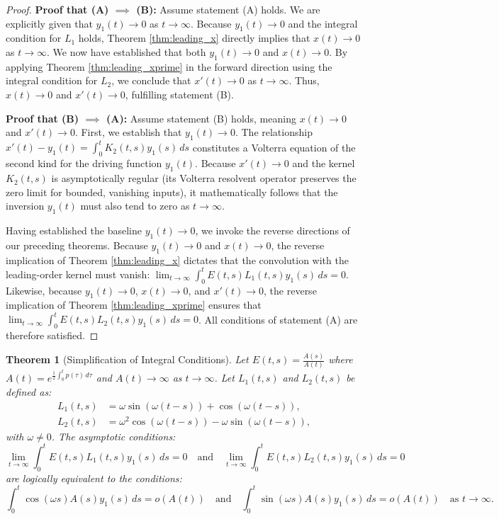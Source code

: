 \documentclass[10pt,reqno]{amsart}
\newtheorem{theorem}{Theorem}
\theoremstyle{definition}
\begin{document}
	\begin{proof}
		\textbf{Proof that (A) $\implies$ (B):}
		Assume statement (A) holds. We are explicitly given that $y_1(t) \to 0$ as $t \to \infty$. 
		Because $y_1(t) \to 0$ and the integral condition for $L_1$ holds, Theorem \ref{thm:leading_x} directly implies that $x(t) \to 0$ as $t \to \infty$.
		We now have established that both $y_1(t) \to 0$ and $x(t) \to 0$. By applying Theorem \ref{thm:leading_xprime} in the forward direction using the integral condition for $L_2$, we conclude that $x'(t) \to 0$ as $t \to \infty$. Thus, $x(t) \to 0$ and $x'(t) \to 0$, fulfilling statement (B).
		
		\textbf{Proof that (B) $\implies$ (A):}
		Assume statement (B) holds, meaning $x(t) \to 0$ and $x'(t) \to 0$.
		First, we establish that $y_1(t) \to 0$. The relationship $x'(t) - y_1(t) = \int_0^t K_2(t, s) y_1(s) \, ds$ constitutes a Volterra equation of the second kind for the driving function $y_1(t)$. Because $x'(t) \to 0$ and the kernel $K_2(t, s)$ is asymptotically regular (its Volterra resolvent operator preserves the zero limit for bounded, vanishing inputs), it mathematically follows that the inversion $y_1(t)$ must also tend to zero as $t \to \infty$. 
		
		Having established the baseline $y_1(t) \to 0$, we invoke the reverse directions of our preceding theorems.
		Because $y_1(t) \to 0$ and $x(t) \to 0$, the reverse implication of Theorem \ref{thm:leading_x} dictates that the convolution with the leading-order kernel must vanish: $\lim_{t \to \infty} \int_0^t E(t, s) L_1(t, s) y_1(s) \, ds = 0$.
		Likewise, because $y_1(t) \to 0$, $x(t) \to 0$, and $x'(t) \to 0$, the reverse implication of Theorem \ref{thm:leading_xprime} ensures that $\lim_{t \to \infty} \int_0^t E(t, s) L_2(t, s) y_1(s) \, ds = 0$. 
		All conditions of statement (A) are therefore satisfied.
	\end{proof}
	
	\begin{theorem}[Simplification of Integral Conditions] \label{thm:integral_simplification}
		Let $E(t, s) = \frac{A(s)}{A(t)}$ where $A(t) = e^{\frac{1}{2} \int_0^t p(\tau) \, d\tau}$ and $A(t) \to \infty$ as $t \to \infty$. Let $L_1(t, s)$ and $L_2(t, s)$ be defined as:
		\begin{align*}
			L_1(t, s) &= \omega \sin(\omega(t-s)) + \cos(\omega(t-s)), \\
			L_2(t, s) &= \omega^2 \cos(\omega(t-s)) - \omega \sin(\omega(t-s)),
		\end{align*}
		with $\omega \neq 0$. The asymptotic conditions:
		\begin{equation} \label{eq:I1_I2_zero}
			\lim_{t \to \infty} \int_0^t E(t, s) L_1(t, s) y_1(s) \, ds = 0 \quad \text{and} \quad \lim_{t \to \infty} \int_0^t E(t, s) L_2(t, s) y_1(s) \, ds = 0
		\end{equation}
		are logically equivalent to the conditions:
		\begin{equation} \label{eq:little_o_conditions}
			\int_0^t \cos(\omega s) A(s) y_1(s) \, ds = o(A(t)) \quad \text{and} \quad \int_0^t \sin(\omega s) A(s) y_1(s) \, ds = o(A(t)) \quad \text{as } t \to \infty.
		\end{equation}
	\end{theorem}
	
\end{document}
